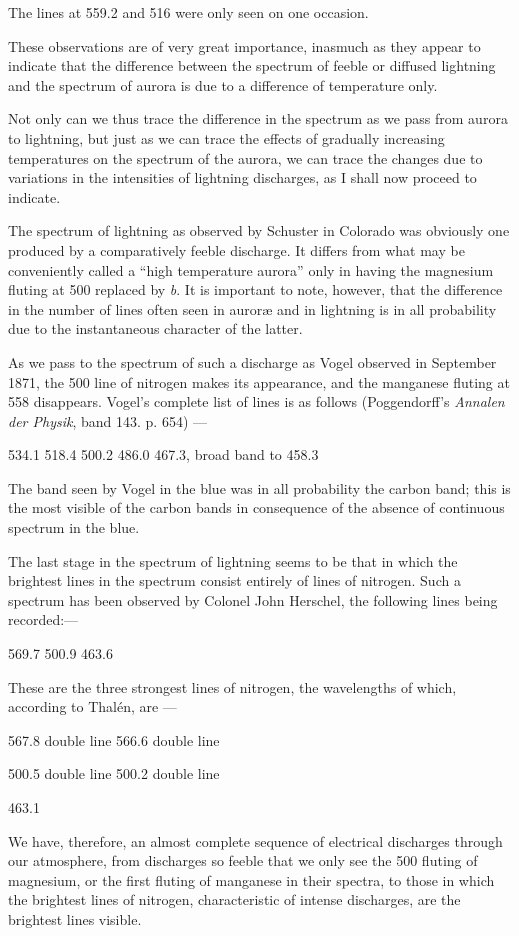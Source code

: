 \documentclass[a4paper, 12pt, oneside, polutonikogreek, english]{article}
\begin{document}
The lines at 559.2 and 516 were only seen on one occasion.

These observations are of very great importance, inasmuch as they appear to indicate that the difference between the spectrum of feeble or diffused lightning and the spectrum of aurora is due to a difference of temperature only.

Not only can we thus trace the difference in the spectrum as we pass from aurora to lightning, but just as we can trace the effects of gradually increasing temperatures on the spectrum of the aurora, we can trace the changes due to variations in the intensities of lightning discharges, as I shall now proceed to indicate.

The spectrum of lightning as observed by Schuster in Colorado was obviously one produced by a comparatively feeble discharge. It differs from what may be conveniently called a ``high temperature aurora'' only in having the magnesium fluting at 500 replaced by \emph{b}. It is important to note, however, that the difference in the number of lines often seen in auroræ and in lightning is in all probability due to the instantaneous character of the latter.

As we pass to the spectrum of such a discharge as Vogel observed in September 1871, the 500 line of nitrogen makes its appearance, and the manganese fluting at 558 disappears. Vogel's complete list of lines is as follows (Poggendorff's \emph{Annalen der Physik}, band 143. p. 654) ---

534.1 
518.4 
500.2 
486.0 
467.3, broad band 
to 458.3

The band seen by Vogel in the blue was in all probability the carbon band; this is the most visible of the carbon bands in consequence of the absence of continuous spectrum in the blue.

The last stage in the spectrum of lightning seems to be that in which the brightest lines in the spectrum consist entirely of lines of nitrogen. Such a spectrum has been observed by Colonel John Herschel, the following lines being recorded:---

569.7 
500.9 
463.6 

These are the three strongest lines of nitrogen, the wavelengths of which, according to Thalén, are ---

567.8 double line 
566.6 double line 

500.5 double line 
500.2 double line 

463.1 

We have, therefore, an almost complete sequence of electrical discharges through our atmosphere, from discharges so feeble that we only see the 500 fluting of magnesium, or the first fluting of manganese in their spectra, to those in which the brightest lines of nitrogen, characteristic of intense discharges, are the brightest lines visible.
\end{document}
